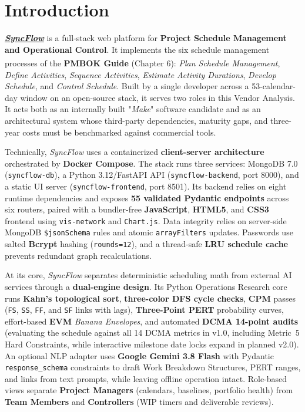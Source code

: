 \chapter{Introduction}
\underline{\textbf{\textit{SyncFlow}}} is a full-stack web platform for \textbf{Project Schedule Management and Operational Control}. It implements the six schedule management processes of the \textbf{PMBOK\textsuperscript{\textregistered} Guide} (Chapter 6): \textit{Plan Schedule Management}, \textit{Define Activities}, \textit{Sequence Activities}, \textit{Estimate Activity Durations}, \textit{Develop Schedule}, and \textit{Control Schedule}. Built by a single developer across a 53-calendar-day window on an open-source stack, it serves two roles in this Vendor Analysis. It acts both as an internally built "\textit{Make}" software candidate and as an architectural system whose third-party dependencies, maturity gaps, and three-year costs must be benchmarked against commercial tools.

\vspace{2mm}

Technically, \textit{SyncFlow} uses a containerized \textbf{client-server architecture} orchestrated by \textbf{Docker Compose}. The stack runs three services: MongoDB 7.0 (\texttt{syncflow-db}), a Python 3.12/FastAPI API (\texttt{syncflow-backend}, port 8000), and a static UI server (\texttt{syncflow-frontend}, port 8501). Its backend relies on eight runtime dependencies and exposes \textbf{55 validated Pydantic endpoints} across six routers, paired with a bundler-free \textbf{JavaScript}, \textbf{HTML5}, and \textbf{CSS3} frontend using \texttt{vis-network} and \texttt{Chart.js}. Data integrity relies on server-side MongoDB \texttt{\$jsonSchema} rules and atomic \texttt{arrayFilters} updates. Passwords use salted \textbf{Bcrypt} hashing (\texttt{rounds=12}), and a thread-safe \textbf{LRU schedule cache} prevents redundant graph recalculations.

\vspace{2mm}

At its core, \textit{SyncFlow} separates deterministic scheduling math from external AI services through a \textbf{dual-engine design}. Its Python Operations Research core runs \textbf{Kahn's topological sort}, \textbf{three-color DFS cycle checks}, \textbf{CPM} passes (\texttt{FS}, \texttt{SS}, \texttt{FF}, and \texttt{SF} links with lags), \textbf{Three-Point PERT} probability curves, effort-based \textbf{EVM} \textit{Banana Envelopes}, and automated \textbf{DCMA 14-point audits} (evaluating the schedule against all 14 DCMA metrics in v1.0, including Metric~5 Hard Constraints, while interactive milestone date locks expand in planned v2.0). An optional NLP adapter uses \textbf{Google Gemini 3.8 Flash} with Pydantic \texttt{response\_schema} constraints to draft Work Breakdown Structures, PERT ranges, and links from text prompts, while leaving offline operation intact. Role-based views separate \textbf{Project Managers} (calendars, baselines, portfolio health) from \textbf{Team Members} and \textbf{Controllers} (WIP timers and deliverable reviews).

